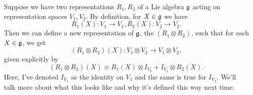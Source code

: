 \begin{defn}
Suppose we have two representations $R_1,R_2$ of a Lie algebra $\mathfrak{g}$ acting on representation spaces $V_1,V_2$. By definition, for $X\in\mathfrak{g}$ we have
$$R_1(X):V_1\to V_1, R_2(X):V_2\to V_2.$$
Then we can define a new representation of $\mathfrak{g}$, the  $(R_1\otimes R_2)$, such that for each $X\in \mathfrak{g}$, we get
$$(R_1\otimes R_2)(X):V_1 \otimes V_2 \to V_1 \otimes V_2,$$
given explicitly by
$$(R_1\otimes R_2)(X)\equiv R_1(X) \otimes I_{V_2} + I_{V_1} \otimes R_2(X).$$
Here, I've denoted $I_{V_1}$ as the identity on $V_1$ and the same is true for $I_{V_2}$. We'll talk more about what this looks like and why it's defined this way next time.
\end{defn}